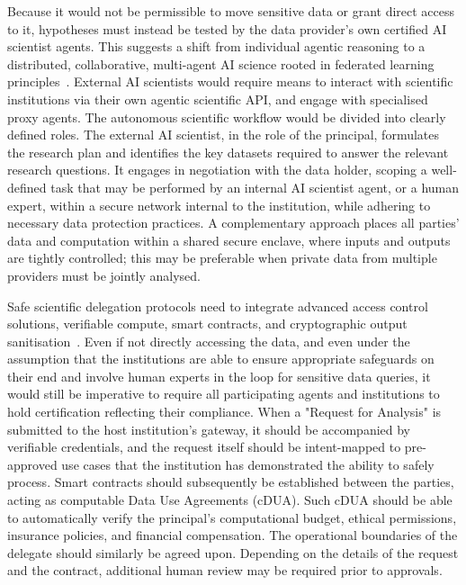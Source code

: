 \documentclass[11pt, a4paper, twocolumn, goog]{google}
\begin{document}
Because it would not be permissible to move sensitive data or grant direct access to it, hypotheses must instead be tested by the data provider's own certified AI scientist agents. This suggests a shift from individual agentic reasoning to a distributed, collaborative, multi-agent AI science rooted in federated learning principles~\citep{mcmahan2017communication, cheng2024toward, kuang2024federatedscope, wu2025survey}. External AI scientists would require means to interact with scientific institutions via their own agentic scientific API, and engage with specialised proxy agents. The autonomous scientific workflow would be divided into clearly defined roles. The external AI scientist, in the role of the principal, formulates the research plan and identifies the key datasets required to answer the relevant research questions. It engages in negotiation with the data holder, scoping a well-defined task that may be performed by an internal AI scientist agent, or a human expert, within a secure network internal to the institution, while adhering to necessary data protection practices. A complementary approach places all parties' data and computation within a shared secure enclave, where inputs and outputs are tightly controlled; this may be preferable when private data from multiple providers must be jointly analysed.

Safe scientific delegation protocols need to integrate advanced access control solutions, verifiable compute, smart contracts, and cryptographic output sanitisation~\citep{kuo2017blockchain}. Even if not directly accessing the data, and even under the assumption that the institutions are able to ensure appropriate safeguards on their end and involve human experts in the loop for sensitive data queries, it would still be imperative to require all participating agents and institutions to hold certification reflecting their compliance. When a "Request for Analysis" is submitted to the host institution's gateway, it should be accompanied by verifiable credentials, and the request itself should be intent-mapped to pre-approved use cases that the institution has demonstrated the ability to safely process. Smart contracts should subsequently be established between the parties, acting as computable Data Use Agreements (cDUA). Such cDUA should be able to automatically verify the principal's computational budget, ethical permissions, insurance policies, and financial compensation. The operational boundaries of the delegate should similarly be agreed upon. Depending on the details of the request and the contract, additional human review may be required prior to approvals.
\end{document}
